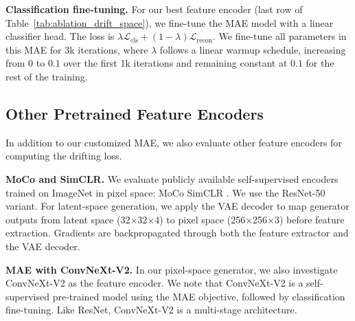 \documentclass{article}
\renewcommand{\paragraph}[1]{\vspace{.05em}\noindent\textbf{#1}}
\theoremstyle{plain}
\theoremstyle{definition}
\theoremstyle{remark}
\begin{document}
\paragraph{Classification fine-tuning.}
For our best feature encoder (last row of Table~\ref{tab:ablation_drift_space}), we fine-tune the MAE model with a linear classifier head.
The loss is $\lambda \mathcal{L}_{\text{cls}} + (1-\lambda)\mathcal{L}_{\text{recon}}$. We fine-tune all parameters in this MAE for 3k iterations, where $\lambda$ follows a linear warmup schedule, increasing from $0$ to $0.1$ over the first 1k iterations and remaining constant at $0.1$ for the rest of the training.


\subsection{Other Pretrained Feature Encoders}
\label{sec:appendix_other_encoders}

In addition to our customized MAE, we also evaluate other feature encoders for computing the drifting loss.

\paragraph{MoCo and SimCLR.} We evaluate publicly available self-supervised encoders trained on ImageNet in pixel space: MoCo \cite{he2020momentum,chen2020improved} SimCLR \cite{chen2020simple}. We use the ResNet-50 variant.
For latent-space generation, we apply the VAE decoder to map generator outputs from latent space (32${\times}$32${\times}$4) to pixel space (256${\times}$256${\times}$3) before feature extraction.
Gradients are backpropagated through both the feature extractor and the VAE decoder.

\paragraph{MAE with ConvNeXt-V2.} In our pixel-space generator, we also investigate ConvNeXt-V2 \citep{woo2023convnext} as the feature encoder. We note that ConvNeXt-V2 is a self-supervised pre-trained model using the MAE objective, followed by classification fine-tuning. Like ResNet, ConvNeXt-V2 is a multi-stage architecture.

\end{document}
